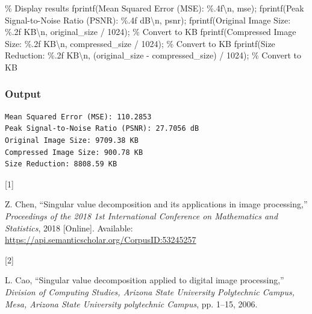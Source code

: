 \documentclass[
  journal,
]{IEEEtran}%
\newenvironment{Shaded}{\begin{snugshade}}{\end{snugshade}}
\newcommand{\CommentTok}[1]{\textcolor[rgb]{0.37,0.37,0.37}{#1}}
\newcommand{\FloatTok}[1]{\textcolor[rgb]{0.68,0.00,0.00}{#1}}
\newcommand{\NormalTok}[1]{\textcolor[rgb]{0.00,0.23,0.31}{#1}}
\newcommand{\OperatorTok}[1]{\textcolor[rgb]{0.37,0.37,0.37}{#1}}
\newcommand{\SpecialStringTok}[1]{\textcolor[rgb]{0.13,0.47,0.30}{#1}}
\newcommand{\VariableTok}[1]{\textcolor[rgb]{0.07,0.07,0.07}{#1}}
\newlength{\cslhangindent}
\newlength{\csllabelwidth}
\newenvironment{CSLReferences}[2] %
 {\begin{list}{}{%
  \setlength{\itemindent}{0pt}
  \setlength{\leftmargin}{0pt}
  \setlength{\parsep}{0pt}
  \ifodd #1
   \setlength{\leftmargin}{\cslhangindent}
   \setlength{\itemindent}{-1\cslhangindent}
  \fi
  \setlength{\itemsep}{#2\baselineskip}}}
 {\end{list}}
\newcommand{\CSLLeftMargin}[1]{\parbox[t]{\csllabelwidth}{\strut#1\strut}}
\newcommand{\CSLRightInline}[1]{\parbox[t]{\linewidth - \csllabelwidth}{\strut#1\strut}}
\begin{document}
\begin{Shaded}
\begin{Highlighting}[]
\CommentTok{\% Display results}
\VariableTok{fprintf}\NormalTok{(}\SpecialStringTok{\textquotesingle{}Mean Squared Error (MSE): \%.4f\textbackslash{}n\textquotesingle{}}\OperatorTok{,} \VariableTok{mse}\NormalTok{)}\OperatorTok{;}
\VariableTok{fprintf}\NormalTok{(}\SpecialStringTok{\textquotesingle{}Peak Signal{-}to{-}Noise Ratio (PSNR): \%.4f dB\textbackslash{}n\textquotesingle{}}\OperatorTok{,} \VariableTok{psnr}\NormalTok{)}\OperatorTok{;}
\VariableTok{fprintf}\NormalTok{(}\SpecialStringTok{\textquotesingle{}Original Image Size: \%.2f KB\textbackslash{}n\textquotesingle{}}\OperatorTok{,} \VariableTok{original\_size} \OperatorTok{/} \FloatTok{1024}\NormalTok{)}\OperatorTok{;} \CommentTok{\% Convert to KB}
\VariableTok{fprintf}\NormalTok{(}\SpecialStringTok{\textquotesingle{}Compressed Image Size: \%.2f KB\textbackslash{}n\textquotesingle{}}\OperatorTok{,} \VariableTok{compressed\_size} \OperatorTok{/} \FloatTok{1024}\NormalTok{)}\OperatorTok{;} \CommentTok{\% Convert to KB}
\VariableTok{fprintf}\NormalTok{(}\SpecialStringTok{\textquotesingle{}Size Reduction: \%.2f KB\textbackslash{}n\textquotesingle{}}\OperatorTok{,}\NormalTok{ (}\VariableTok{original\_size} \OperatorTok{{-}} \VariableTok{compressed\_size}\NormalTok{) }\OperatorTok{/} \FloatTok{1024}\NormalTok{)}\OperatorTok{;} \CommentTok{\% Convert to KB}
\end{Highlighting}
\end{Shaded}

\subsubsection{Output}

\begin{verbatim}
Mean Squared Error (MSE): 110.2853
Peak Signal-to-Noise Ratio (PSNR): 27.7056 dB
Original Image Size: 9709.38 KB
Compressed Image Size: 900.78 KB
Size Reduction: 8808.59 KB
\end{verbatim}

\label{refs}
\begin{CSLReferences}{0}{0}
\CSLLeftMargin{{[}1{]} }%
\CSLRightInline{Z. Chen, {``Singular value decomposition and its
applications in image processing,''} \emph{Proceedings of the 2018 1st
International Conference on Mathematics and Statistics}, 2018
{[}Online{]}. Available:
\url{https://api.semanticscholar.org/CorpusID:53245257}}

\CSLLeftMargin{{[}2{]} }%
\CSLRightInline{L. Cao, {``Singular value decomposition applied to
digital image processing,''} \emph{Division of Computing Studies,
Arizona State University Polytechnic Campus, Mesa, Arizona State
University polytechnic Campus}, pp. 1--15, 2006. }

\end{CSLReferences}
\end{document}
